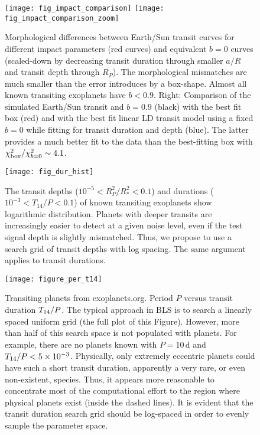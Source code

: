 \documentclass[twocolumn,tighten,longauthor]{myaastex62}
\begin{document}
\clearpage

\begin{figure*}
\texttt{[image: fig\_impact\_comparison]}
\texttt{[image: fig\_impact\_comparison\_zoom]}
\caption{\label{fig:morphology}Morphological differences between Earth/Sun transit curves for different impact parameters (red curves) and equivalent $b=0$ curves (scaled-down by decreasing transit duration through smaller $a/R$ and transit depth through $R_P$). The morphological mismatches are much smaller than the error introduces by a box-shape. Almost all known transiting exoplanets have $b<0.9$. Right: Comparison of the simulated Earth/Sun transit and $b=0.9$ (black) with the best fit box (red) and with the best fit linear LD transit model using a fixed $b=0$ while fitting for transit duration and depth (blue). The latter provides a much better fit to the data than the best-fitting box with $\chi^2_{\rm box}/\chi^2_{b=0}\sim4.1$.}
\end{figure*}

\clearpage

\begin{figure}
\texttt{[image: fig\_dur\_hist]}
\caption{\label{fig:dur_hist}The transit depths ($10^{-5} < R_P^2/R_*^2 < 0.1$) and durations ($10^{-3} < T_{14}/P < 0.1$) of known transiting exoplanets show logarithmic distribution. Planets with deeper transits are increasingly easier to detect at a given noise level, even if the test signal depth is slightly mismatched. Thus, we propose to use a search grid of transit depths with log spacing. The same argument applies to transit durations.}
\end{figure}

\clearpage

\begin{figure}
\texttt{[image: figure\_per\_t14]}
\caption{\label{fig:per_t14}Transiting planets from exoplanets.org. Period $P$ versus transit duration $T_{\rm 14}/P$. The typical approach in BLS is to search a linearly spaced uniform grid (the full plot of this Figure). However, more than half of this search space is not populated with planets. For example, there are no planets known with $P=10\,$d and $T_{\rm 14}/P<5\times10^{-3}$. Physically, only extremely eccentric planets could have such a short transit duration, apparently a very rare, or even non-existent, species. Thus, it appears more reasonable to concentrate most of the computational effort to the region where physical planets exist (inside the dashed lines). It is evident that the transit duration search grid should be log-spaced in order to evenly sample the parameter space.}
\end{figure}
\end{document}
